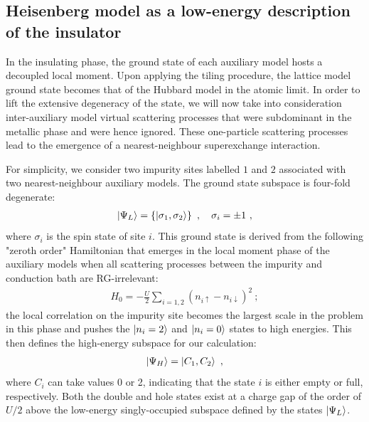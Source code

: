 \documentclass[reprint,hidelinks,onecolumn]{revtex4-2}
\begin{document}
\subsection{Heisenberg model as a low-energy description of the insulator}

In the insulating phase, the ground state of each auxiliary model hosts a decoupled local moment. Upon applying the tiling procedure, the lattice model ground state becomes that of the Hubbard model in the atomic limit. In order to lift the extensive degeneracy of the state, we will now take into consideration inter-auxiliary model virtual scattering processes that were subdominant in the metallic phase and were hence ignored. These one-particle scattering processes lead to the emergence of a nearest-neighbour superexchange interaction.

For simplicity, we consider two impurity sites labelled \(1\) and \(2\) associated with two nearest-neighbour auxiliary models. The ground state subspace is four-fold degenerate:
\begin{equation}\begin{aligned}
	\ket{\Psi_L} = \left\{\ket{\sigma_1,\sigma_2}\right\}~,\quad \sigma_i = \pm 1~,
\end{aligned}\end{equation}
where \(\sigma_i\) is the spin state of site \(i\). This ground state is derived from the following "zeroth order" Hamiltonian that emerges in the local moment phase of the auxiliary models when all scattering processes between the impurity and conduction bath are RG-irrelevant:
\begin{equation}\begin{aligned}
	H_0 = -\frac{U}{2}\sum_{i=1,2}\left(n_{i \uparrow} - n_{i \downarrow}\right)^2~;
\end{aligned}\end{equation}
the local correlation on the impurity site becomes the largest scale in the problem in this phase and pushes the \(\ket{n_i=2}\) and \(\ket{n_i=0}\) states to high energies. This then defines the high-energy subspace for our calculation:
\begin{equation}\begin{aligned}
	\ket{\Psi_H} = \ket{C_1,C_2}~,
\end{aligned}\end{equation}
where \(C_i\) can take values 0 or 2, indicating that the state \(i\) is either empty or full, respectively. Both the double and hole states exist at a charge gap of the order of \(U/2\) above the low-energy singly-occupied subspace defined by the states \(\ket{\Psi_L}\).
\end{document}
